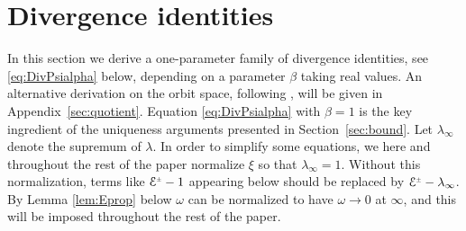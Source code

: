 \documentclass[a4paper,11pt,reqno]{amsart}
\newcommand{\cE}{\mathcal{E}}
\theoremstyle{plain}
\newcommand{\PM}[1]{{{#1}^{\hspace{-.5pt}\scaleto{\pm}{3.5pt}}}}
\numberwithin{equation}{section}
\begin{document}
%
%
%
%
%
%
%
%



\section{Divergence identities} \label{sec:divident}
In this section 
we derive a one-parameter family of divergence identities, see  \eqref{eq:DivPsialpha} below, depending on a parameter $\beta$ taking real values. An alternative derivation on the orbit space, following \cite{MR747036,simon:1995}, will be given in Appendix~\ref{sec:quotient}.  Equation \eqref{eq:DivPsialpha} with $\beta =1$ is the key ingredient of the uniqueness arguments presented in Section~\ref{sec:bound}. 
Let $\lambda_\infty$ denote the supremum of $\lambda$.
In order to simplify some equations, we here and throughout the rest of the paper normalize $\xi$ so that $\lambda_\infty = 1$. 
Without this normalization, terms like $\PM{\cE} - 1$ appearing below should be replaced by 
$\PM{\cE}-\lambda_\infty$. By Lemma \ref{lem:Eprop} below $\omega$ can be normalized to have $\omega \rightarrow 0$ at $\infty$, and this will be imposed throughout the rest of the paper. 
\end{document}
